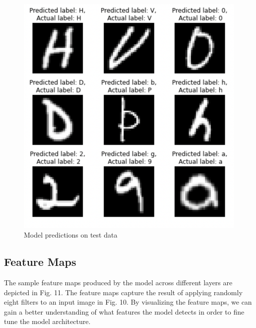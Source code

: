 \documentclass[conference]{IEEEtran}
\begin{document}
\begin{figure}[h!]
\centering
\includegraphics[width=1\linewidth]{images/prediction.jpg}
\caption{Model predictions on test data}
\label{fig:prediction}
\end{figure}

\subsection{Feature Maps}

The sample feature maps produced by the model across different layers are depicted in Fig. 11. The feature maps capture the result of applying randomly eight filters to an input image in Fig. 10. By visualizing the feature maps, we can gain a better understanding of what features the model detects in order to fine tune the model architecture. 
\end{document}
